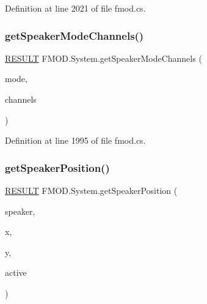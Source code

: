 Definition at line 2021 of file fmod.\+cs.

\mbox{\label{class_f_m_o_d_1_1_system_a33b75777c0363c614826cca922b54d32}} 
\subsubsection{\texorpdfstring{get\+Speaker\+Mode\+Channels()}{getSpeakerModeChannels()}}
{\footnotesize\ttfamily \hyperlink{namespace_f_m_o_d_a305d1176ef3f8c8815861a60407ac33d}{R\+E\+S\+U\+LT} F\+M\+O\+D.\+System.\+get\+Speaker\+Mode\+Channels (\begin{DoxyParamCaption}\item[{\hyperlink{namespace_f_m_o_d_aa0732e7e8efd3b96b526a7f2f8479634}{S\+P\+E\+A\+K\+E\+R\+M\+O\+DE}}]{mode,  }\item[{out int}]{channels }\end{DoxyParamCaption})}



Definition at line 1995 of file fmod.\+cs.

\mbox{\label{class_f_m_o_d_1_1_system_a55fcdf28d176b0249892c87e2fc90afd}} 
\subsubsection{\texorpdfstring{get\+Speaker\+Position()}{getSpeakerPosition()}}
{\footnotesize\ttfamily \hyperlink{namespace_f_m_o_d_a305d1176ef3f8c8815861a60407ac33d}{R\+E\+S\+U\+LT} F\+M\+O\+D.\+System.\+get\+Speaker\+Position (\begin{DoxyParamCaption}\item[{\hyperlink{namespace_f_m_o_d_a5ccb2623e74daa810e486429d60e4f48}{S\+P\+E\+A\+K\+ER}}]{speaker,  }\item[{out float}]{x,  }\item[{out float}]{y,  }\item[{out bool}]{active }\end{DoxyParamCaption})}



